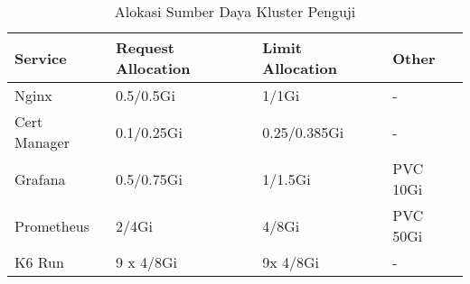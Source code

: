 \begin{table}[htbp]
    \centering
    \caption{Alokasi Sumber Daya Kluster Penguji}
    \label{tab:test-cluster-allocation}
    \begin{tabular}{|l|l|l|l|}
        \hline
        \textbf{Service} & \textbf{Request Allocation} & \textbf{Limit Allocation} & \textbf{Other} \\ \hline
        Nginx            & 0.5/0.5Gi                   & 1/1Gi                     & -              \\ \hline
        Cert Manager     & 0.1/0.25Gi                  & 0.25/0.385Gi              & -              \\ \hline
        Grafana          & 0.5/0.75Gi                  & 1/1.5Gi                   & PVC 10Gi       \\ \hline
        Prometheus       & 2/4Gi                       & 4/8Gi                     & PVC 50Gi       \\ \hline
        K6 Run           & 9 x 4/8Gi                   & 9x 4/8Gi                  & -              \\ \hline
    \end{tabular}
\end{table}


